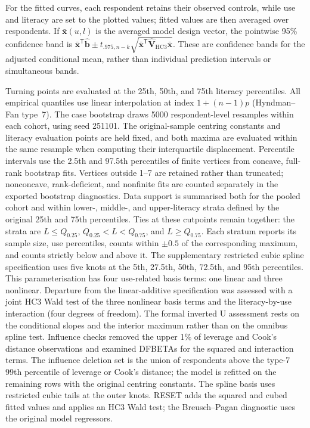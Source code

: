 \documentclass[sustainability,article,accept,moreauthors]{Definitions/mdpi}
\begin{document}
For the fitted curves, each respondent retains their observed controls, while use and literacy are set to the plotted values; fitted values are then averaged over respondents. If $\bar{\mathbf{x}}(u,l)$ is the averaged model design vector, the pointwise 95\% confidence band is $\bar{\mathbf{x}}^{\mathsf T}\hat{\mathbf b}\pm t_{.975,n-k}\sqrt{\bar{\mathbf{x}}^{\mathsf T}\widehat{\mathbf V}_{\mathrm{HC3}}\bar{\mathbf{x}}}$. These are confidence bands for the adjusted conditional mean, rather than individual prediction intervals or simultaneous bands.

Turning points are evaluated at the 25th, 50th, and 75th literacy percentiles. All empirical quantiles use linear interpolation at index $1+(n-1)p$ (Hyndman--Fan type~7). The case bootstrap draws 5000 respondent-level resamples within each cohort, using seed 251101. The original-sample centring constants and literacy evaluation points are held fixed, and both maxima are evaluated within the same resample when computing their interquartile displacement. Percentile intervals use the 2.5th and 97.5th percentiles of finite vertices from concave, full-rank bootstrap fits. Vertices outside 1--7 are retained rather than truncated; nonconcave, rank-deficient, and nonfinite fits are counted separately in the exported bootstrap diagnostics. Data support is summarised both for the pooled cohort and within lower-, middle-, and upper-literacy strata defined by the original 25th and 75th percentiles. Ties at these cutpoints remain together: the strata are $L\le Q_{0.25}$, $Q_{0.25}<L<Q_{0.75}$, and $L\ge Q_{0.75}$. Each stratum reports its sample size, use percentiles, counts within $\pm0.5$ of the corresponding maximum, and counts strictly below and above it. The supplementary restricted cubic spline specification uses five knots at the 5th, 27.5th, 50th, 72.5th, and 95th percentiles. This parameterisation has four use-related basis terms: one linear and three nonlinear. Departure from the linear-additive specification was assessed with a joint HC3 Wald test of the three nonlinear basis terms and the literacy-by-use interaction (four degrees of freedom). The formal inverted U assessment rests on the conditional slopes and the interior maximum rather than on the omnibus spline test. Influence checks removed the upper 1\% of leverage and Cook's distance observations and examined DFBETAs for the squared and interaction terms. The influence deletion set is the union of respondents above the type-7 99th percentile of leverage or Cook's distance; the model is refitted on the remaining rows with the original centring constants. The spline basis uses restricted cubic tails at the outer knots. RESET adds the squared and cubed fitted values and applies an HC3 Wald test; the Breusch--Pagan diagnostic uses the original model regressors.
\end{document}
